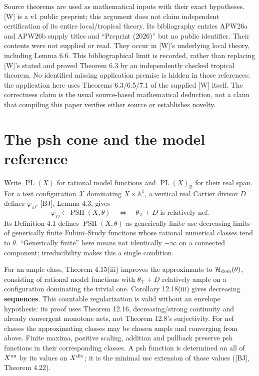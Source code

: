 \documentclass[11pt]{article}
\begin{document}
Source theorems are used as mathematical inputs with their exact
hypotheses. {[}W{]} is a v1 public preprint; this argument does not
claim independent certification of its entire local/tropical theory. Its
bibliography entries APW26a and APW26b supply titles and ``Preprint
(2026)'' but no public identifier. Their contents were not supplied or
read. They occur in {[}W{]}'s underlying local theory, including Lemma
6.6. This bibliographical limit is recorded, rather than replacing
{[}W{]}'s stated and proved Theorem 6.3 by an independently checked
tropical theorem. No identified missing application premise is hidden in
those references: the application here uses Theorems 6.3/6.5/7.1 of the
supplied {[}W{]} itself. The correctness claim is the usual source-based
mathematical deduction, not a claim that compiling this paper verifies
either source or establishes novelty.

\section{The psh cone and the model
reference}\label{the-psh-cone-and-the-model-reference}

Write \(\operatorname{PL}(X)\) for rational model functions and
\(\operatorname{PL}(X)_{\mathbb R}\) for their real span. For a test
configuration \(\mathcal X\) dominating \(X\times\mathbb A^1\), a
vertical real Cartier divisor \(D\) defines \(\varphi_D\). {[}BJ{]},
Lemma 4.3, gives \[\varphi_D\in\operatorname{PSH}(X,\theta)
\quad\Longleftrightarrow\quad \theta_{\mathcal X}+D\text{ is relatively nef}.\]
Its Definition 4.1 defines \(\operatorname{PSH}(X,\theta)\) as
generically finite usc decreasing limits of generically finite
Fubini--Study functions whose rational numerical classes tend to
\(\theta\). ``Generically finite'' here means not identically
\(-\infty\) on a connected component; irreducibility makes this a single
condition.

For an ample class, Theorem 4.15(iii) improves the approximants to
\(\mathcal H_{\rm dom}(\theta)\), consisting of rational model functions
with \(\theta_{\mathcal X}+D\) relatively ample on a configuration
dominating the trivial one. Corollary 12.18(iii) gives decreasing
\textbf{sequences}. This countable regularization is valid without an
envelope hypothesis: its proof uses Theorem 12.16, decreasing/strong
continuity and already convergent monotone nets, not Theorem 12.8's
surjectivity. For nef classes the approximating classes may be chosen
ample and converging from above. Finite maxima, positive scaling,
addition and pullback preserve psh functions in their corresponding
classes. A psh function is determined on all of \(X^{\rm an}\) by its
values on \(X^{\rm div}\); it is the minimal usc extension of those
values ({[}BJ{]}, Theorem 4.22).
\end{document}
